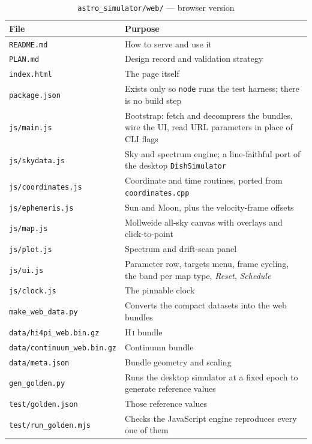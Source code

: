 \documentclass[11pt,a4paper]{article}
\begin{document}
\begin{table}[H]
\centering
\caption{\texttt{astro\_simulator/web/} --- browser version}
\small
\begin{tabular}{lp{8.4cm}}
\toprule
\textbf{File} & \textbf{Purpose} \\
\midrule
\texttt{README.md} & How to serve and use it \\
\texttt{PLAN.md} & Design record and validation strategy \\
\texttt{index.html} & The page itself \\
\texttt{package.json} & Exists only so \texttt{node} runs the test harness; there is no build step \\
\texttt{js/main.js} & Bootstrap: fetch and decompress the bundles, wire the UI, read URL parameters in place of CLI flags \\
\texttt{js/skydata.js} & Sky and spectrum engine; a line-faithful port of the desktop \texttt{DishSimulator} \\
\texttt{js/coordinates.js} & Coordinate and time routines, ported from \texttt{coordinates.cpp} \\
\texttt{js/ephemeris.js} & Sun and Moon, plus the velocity-frame offsets \\
\texttt{js/map.js} & Mollweide all-sky canvas with overlays and click-to-point \\
\texttt{js/plot.js} & Spectrum and drift-scan panel \\
\texttt{js/ui.js} & Parameter row, targets menu, frame cycling, the band per map type, \emph{Reset}, \emph{Schedule} \\
\texttt{js/clock.js} & The pinnable clock \\
\texttt{make\_web\_data.py} & Converts the compact datasets into the web bundles \\
\texttt{data/hi4pi\_web.bin.gz} & H\,\textsc{i} bundle \\
\texttt{data/continuum\_web.bin.gz} & Continuum bundle \\
\texttt{data/meta.json} & Bundle geometry and scaling \\
\texttt{gen\_golden.py} & Runs the desktop simulator at a fixed epoch to generate reference values \\
\texttt{test/golden.json} & Those reference values \\
\texttt{test/run\_golden.mjs} & Checks the JavaScript engine reproduces every one of them \\
\bottomrule
\end{tabular}
\end{table}
\end{document}
